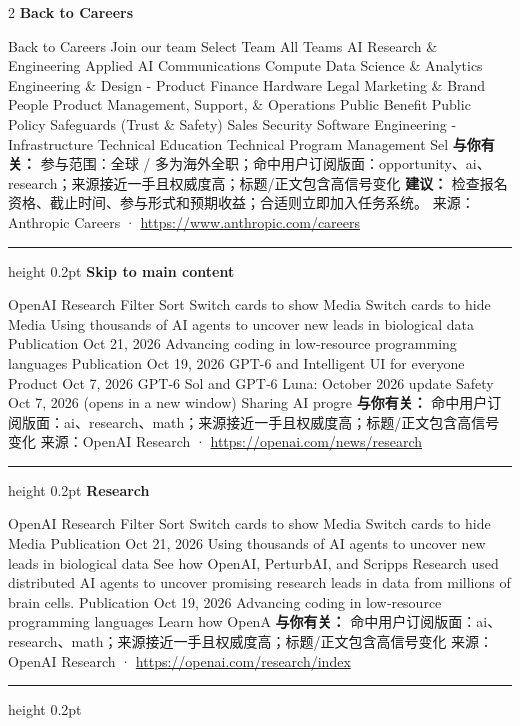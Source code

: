 \documentclass[10.5pt]{ctexart}
\begin{document}
\begin{multicols}{2}
{\large\bfseries Back to Careers}\par
Back to Careers Join our team Select Team All Teams AI Research \& Engineering Applied AI Communications Compute Data Science \& Analytics Engineering \& Design - Product Finance Hardware Legal Marketing \& Brand People Product Management, Support, \& Operations Public Benefit Public Policy Safeguards (Trust \& Safety) Sales Security Software Engineering - Infrastructure Technical Education Technical Program Management Sel
\textbf{与你有关：} 参与范围：全球 / 多为海外全职；命中用户订阅版面：opportunity、ai、research；来源接近一手且权威度高；标题/正文包含高信号变化
\textbf{建议：} 检查报名资格、截止时间、参与形式和预期收益；合适则立即加入任务系统。
{\footnotesize\color{ormuted} 来源：Anthropic Careers · \url{https://www.anthropic.com/careers}}
\vspace{2mm}
\hrule height 0.2pt
\vspace{2mm}
{\large\bfseries Skip to main content}\par
OpenAI Research Filter Sort Switch cards to show Media Switch cards to hide Media Using thousands of AI agents to uncover new leads in biological data Publication Oct 21, 2026 Advancing coding in low‑resource programming languages Publication Oct 19, 2026 GPT-6 and Intelligent UI for everyone Product Oct 7, 2026 GPT‑6 Sol and GPT‑6 Luna: October 2026 update Safety Oct 7, 2026 (opens in a new window) Sharing AI progre
\textbf{与你有关：} 命中用户订阅版面：ai、research、math；来源接近一手且权威度高；标题/正文包含高信号变化
{\footnotesize\color{ormuted} 来源：OpenAI Research · \url{https://openai.com/news/research}}
\vspace{2mm}
\hrule height 0.2pt
\vspace{2mm}
{\large\bfseries Research}\par
OpenAI Research Filter Sort Switch cards to show Media Switch cards to hide Media Publication Oct 21, 2026 Using thousands of AI agents to uncover new leads in biological data See how OpenAI, PerturbAI, and Scripps Research used distributed AI agents to uncover promising research leads in data from millions of brain cells. Publication Oct 19, 2026 Advancing coding in low‑resource programming languages Learn how OpenA
\textbf{与你有关：} 命中用户订阅版面：ai、research、math；来源接近一手且权威度高；标题/正文包含高信号变化
{\footnotesize\color{ormuted} 来源：OpenAI Research · \url{https://openai.com/research/index}}
\vspace{2mm}
\hrule height 0.2pt

\end{multicols}
\end{document}
